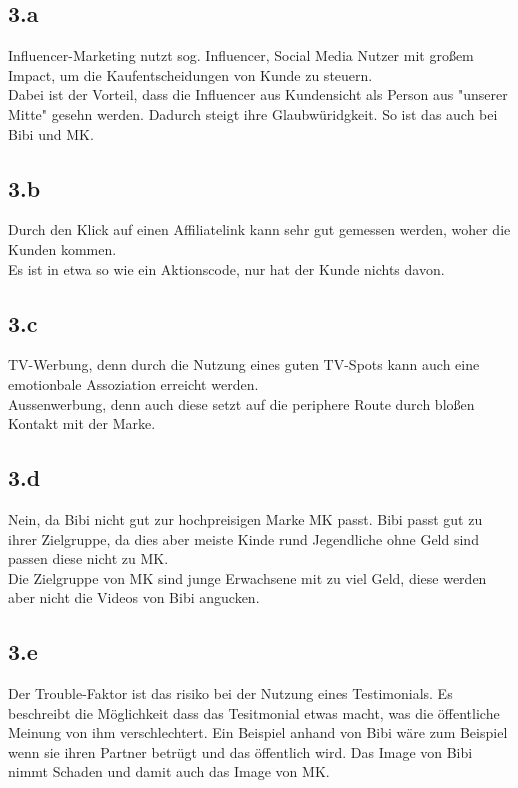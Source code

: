 \subsection{3.a}
    Influencer-Marketing nutzt sog. Influencer, Social Media Nutzer mit großem Impact, um die Kaufentscheidungen von Kunde zu steuern. \\
    Dabei ist der Vorteil, dass die Influencer aus Kundensicht als Person aus "unserer Mitte" gesehn werden. Dadurch steigt ihre Glaubwüridgkeit.
    So ist das auch bei Bibi und MK.

\subsection{3.b}
    Durch den Klick auf einen Affiliatelink kann sehr gut gemessen werden, woher die Kunden kommen. \\
    Es ist in etwa so wie ein Aktionscode, nur hat der Kunde nichts davon.

\subsection{3.c}
    TV-Werbung, denn durch die Nutzung eines guten TV-Spots kann auch eine emotionbale Assoziation erreicht werden. \\
    Aussenwerbung, denn auch diese setzt auf die periphere Route durch bloßen Kontakt mit der Marke. \\
    
\subsection{3.d}
    Nein, da Bibi nicht gut zur hochpreisigen Marke MK passt. Bibi passt gut zu ihrer Zielgruppe, da dies aber meiste Kinde rund Jegendliche ohne Geld sind passen diese nicht zu MK. \\
    Die Zielgruppe von MK sind junge Erwachsene mit zu viel Geld, diese werden aber nicht die Videos von Bibi angucken.

\subsection{3.e}
    Der Trouble-Faktor ist das risiko bei der Nutzung eines Testimonials. 
    Es beschreibt die Möglichkeit dass das Tesitmonial etwas macht, was die öffentliche Meinung von ihm verschlechtert.
    Ein Beispiel anhand von Bibi wäre zum Beispiel wenn sie ihren Partner betrügt und das öffentlich wird. Das Image von Bibi nimmt Schaden und damit auch das Image von MK.

